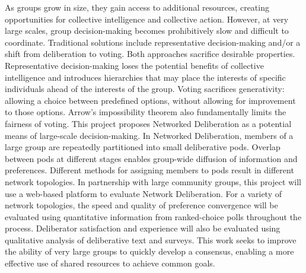 As groups grow in size, they gain access to additional resources,
creating opportunities for collective intelligence and collective action.
However, at very large scales, group decision-making becomes prohibitively slow and difficult
to coordinate.
Traditional solutions include representative decision-making and/or a shift from deliberation
to voting.
Both approaches sacrifice desirable properties.
Representative decision-making loses the potential benefits of collective intelligence and
introduces hierarchies that may place the interests of specific individuals ahead of the
interests of the group.
Voting sacrifices generativity: allowing a choice between predefined options,
without allowing for improvement to those options.
Arrow’s impossibility theorem also fundamentally limits the fairness of voting.
This project proposes Networked Deliberation as a potential means of large-scale decision-making.
In Networked Deliberation, members of a large group are repeatedly partitioned into small
deliberative pods.
Overlap between pods at different stages enables group-wide diffusion of information and
preferences.
Different methods for assigning members to pods result in different network topologies.
In partnership with large community groups, this project will use a web-based platform to
evaluate Network Deliberation.
For a variety of network topologies, the speed and quality of preference convergence will be
evaluated using quantitative information from ranked-choice polls throughout the process.
Deliberator satisfaction and experience will also be evaluated using qualitative analysis of
deliberative text and surveys.
This work seeks to improve the ability of very large groups to quickly develop a consensus,
enabling a more effective use of shared resources to achieve common goals.